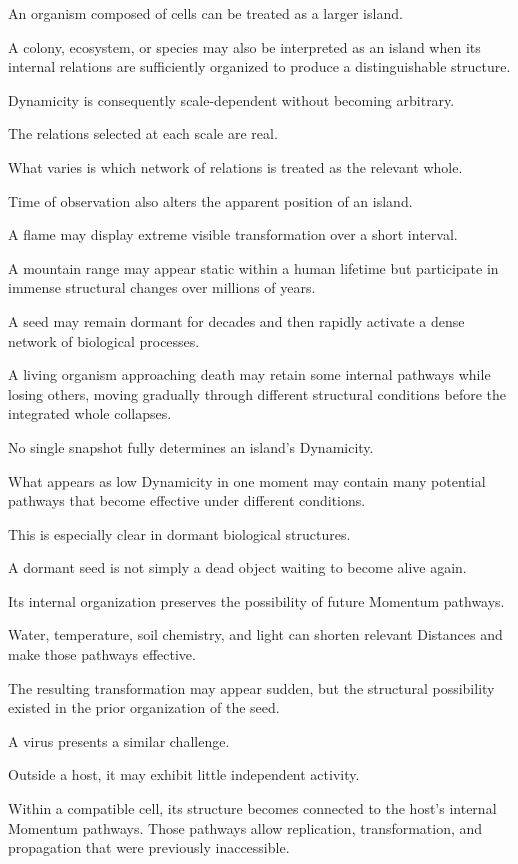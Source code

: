 An organism composed of cells can be treated as a larger island.

A colony, ecosystem, or species may also be interpreted as an island when its internal relations are sufficiently organized to produce a distinguishable structure.

Dynamicity is consequently scale-dependent without becoming arbitrary.

The relations selected at each scale are real.

What varies is which network of relations is treated as the relevant whole.

Time of observation also alters the apparent position of an island.

A flame may display extreme visible transformation over a short interval.

A mountain range may appear static within a human lifetime but participate in immense structural changes over millions of years.

A seed may remain dormant for decades and then rapidly activate a dense network of biological processes.

A living organism approaching death may retain some internal pathways while losing others, moving gradually through different structural conditions before the integrated whole collapses.

No single snapshot fully determines an island’s Dynamicity.

What appears as low Dynamicity in one moment may contain many potential pathways that become effective under different conditions.

This is especially clear in dormant biological structures.

A dormant seed is not simply a dead object waiting to become alive again.

Its internal organization preserves the possibility of future Momentum pathways.

Water, temperature, soil chemistry, and light can shorten relevant Distances and make those pathways effective.

The resulting transformation may appear sudden, but the structural possibility existed in the prior organization of the seed.

A virus presents a similar challenge.

Outside a host, it may exhibit little independent activity.

Within a compatible cell, its structure becomes connected to the host’s internal Momentum pathways. Those pathways allow replication, transformation, and propagation that were previously inaccessible.

